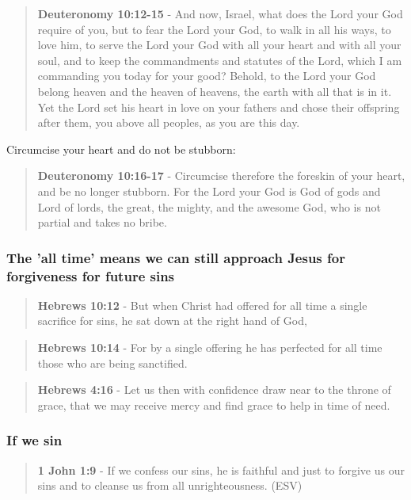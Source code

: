 \documentclass[11pt]{article}
\begin{document}
\begin{quote}
\textbf{Deuteronomy 10:12-15} - And now, Israel, what does the Lord your God require of you, but to fear the Lord your God, to walk in all his ways, to love him, to serve the Lord your God with all your heart and with all your soul, and to keep the commandments and statutes of the Lord, which I am commanding you today for your good? Behold, to the Lord your God belong heaven and the heaven of heavens, the earth with all that is in it. Yet the Lord set his heart in love on your fathers and chose their offspring after them, you above all peoples, as you are this day.
\end{quote}

Circumcise your heart and do not be stubborn:

\begin{quote}
\textbf{Deuteronomy 10:16-17} - Circumcise therefore the foreskin of your heart, and be no longer stubborn. For the Lord your God is God of gods and Lord of lords, the great, the mighty, and the awesome God, who is not partial and takes no bribe.
\end{quote}

\subsubsection{The 'all time' means we can still approach Jesus for forgiveness for future sins}
\label{sec:orga8b7f79}
\begin{quote}
\textbf{Hebrews 10:12} - But when Christ had offered for all time a single sacrifice for sins, he sat down at the right hand of God,
\end{quote}

\begin{quote}
\textbf{Hebrews 10:14} - For by a single offering he has perfected for all time those who are being sanctified.
\end{quote}

\begin{quote}
\textbf{Hebrews 4:16} - Let us then with confidence draw near to the throne of grace, that we may receive mercy and find grace to help in time of need.
\end{quote}

\subsubsection{If we sin}
\label{sec:org0a4db2b}
\begin{quote}
\textbf{1 John 1:9} -  If we confess our sins, he is faithful and just to forgive us our sins and to cleanse us from all unrighteousness.  (ESV)
\end{quote}
\end{document}
